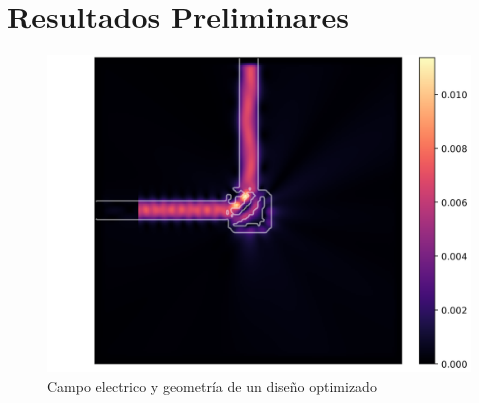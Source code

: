 \chapter{Resultados Preliminares}



\begin{figure}[ht]
  \centering
  \includegraphics[width=\textwidth]{image/results/device.png}
  \caption{Campo electrico y geometría de un diseño optimizado}
  \label{fig:device}
\end{figure}

